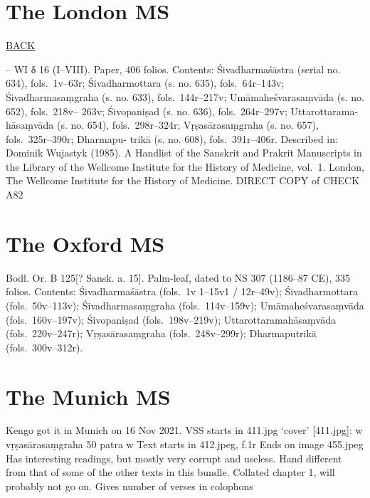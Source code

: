 \documentclass[]{article}
\begin{document}
\hypertarget{the-london-ms}{%
\section{The London MS}\label{the-london-ms}}

\href{Manuscripts\%20consulted}{BACK}

-- WI δ 16 (I--VIII). Paper, 406 folios. Contents: Śivadharmaśāstra
(serial no. 634), fols.~1v--63r; Śivadharmottara (s. no. 635),
fols.~64r--143v; Śivadharmasaṃgraha (s. no. 633), fols.~144r--217v;
Umāmaheśvarasaṃvāda (s. no. 652), fols.~218v-- 263v; Śivopaniṣad (s. no.
636), fols.~264r--297v; Uttarottarama-hāsaṃvāda (s. no. 654),
fols.~298r--324r; Vṛṣasārasaṃgraha (s. no. 657), fols.~325r--390r;
Dharmapu- trikā (s. no. 608), fols.~391r--406r. Described in: Dominik
Wujastyk (1985). A Handlist of the Sanskrit and Prakrit Manuscripts in
the Library of the Wellcome Institute for the History of Medicine,
vol.~1. London, The Wellcome Institute for the History of Medicine.
DIRECT COPY of CHECK A82

\hypertarget{the-oxford-ms}{%
\section{The Oxford MS}\label{the-oxford-ms}}

Bodl. Or. B 125{[}? Sansk. a. 15{]}. Palm-leaf, dated to NS 307
(1186--87 CE), 335 folios. Contents: Śivadharmaśāstra (fols.~1v 1--15v1
/ 12r--49v); Śivadharmottara (fols.~50v--113v); Śivadharmasaṃgraha
(fols.~114v--159v); Umāmaheśvarasaṃvāda (fols.~160v--197v); Śivopaniṣad
(fols.~198v--219v); Uttarottaramahāsaṃvāda (fols.~220v--247r);
Vṛṣasārasaṃgraha (fols.~248v--299r); Dharmaputrikā (fols.~300v--312r).

\hypertarget{the-munich-ms}{%
\section{The Munich MS}\label{the-munich-ms}}

Kengo got it in Munich on 16 Nov 2021. VSS starts in 411.jpg `cover'
{[}411.jpg{]}: \textbar{}\textbar{}w\textbar{}\textbar{}
vṛṣasārasaṃgraha 50 patra \textbar{}\textbar{}w\textbar{}\textbar{} Text
starts in 412.jpeg, f.1r Ends on image 455.jpeg Has interesting
readings, but mostly very corrupt and useless. Hand different from that
of some of the other texts in this bundle. Collated chapter 1, will
probably not go on. Gives number of verses in colophons
\end{document}
